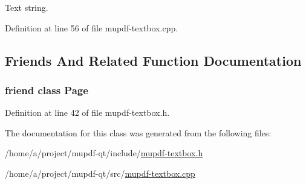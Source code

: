 Text string. 



Definition at line 56 of file mupdf-\/textbox.\-cpp.



\subsection{Friends And Related Function Documentation}
\hypertarget{class_mu_p_d_f_1_1_text_box_a66d145c56e1747e0aecb5309042ab183}{
\subsubsection[{Page}]{\setlength{\rightskip}{0pt plus 5cm}friend class {\bf Page}\hspace{0.3cm}{\ttfamily [friend]}}}\label{class_mu_p_d_f_1_1_text_box_a66d145c56e1747e0aecb5309042ab183}


Definition at line 42 of file mupdf-\/textbox.\-h.



The documentation for this class was generated from the following files\-:\begin{DoxyCompactItemize}
\item 
/home/a/project/mupdf-\/qt/include/\hyperlink{mupdf-textbox_8h}{mupdf-\/textbox.\-h}\item 
/home/a/project/mupdf-\/qt/src/\hyperlink{mupdf-textbox_8cpp}{mupdf-\/textbox.\-cpp}\end{DoxyCompactItemize}
